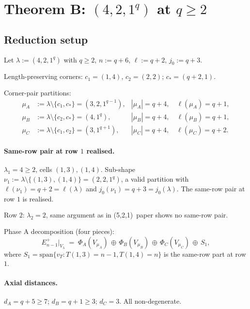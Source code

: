 \documentclass[11pt]{article}
\theoremstyle{definition}
\begin{document}
\section{Theorem B: $(4, 2, 1^q)$ at $q \ge 2$}\label{sec:421}

\subsection{Reduction setup}

Let $\lambda := (4, 2, 1^q)$ with $q \ge 2$, $n := q + 6$,
$\ell := q + 2$, $j_0 := q + 3$.

Length-preserving corners: $c_1 = (1, 4)$, $c_2 = (2, 2)$;
$c_* = (q + 2, 1)$.

Corner-pair partitions:
\begin{align*}
   \mu_A &:= \lambda \setminus \{c_1, c_*\} = (3, 2, 1^{q-1}),
      & |\mu_A| = q + 4, \quad \ell(\mu_A) = q + 1,\\
   \mu_B &:= \lambda \setminus \{c_2, c_*\} = (4, 1^q),
      & |\mu_B| = q + 4, \quad \ell(\mu_B) = q + 1,\\
   \mu_C &:= \lambda \setminus \{c_1, c_2\} = (3, 1^{q+1}),
      & |\mu_C| = q + 4, \quad \ell(\mu_C) = q + 2.
\end{align*}

\paragraph{Same-row pair at row $1$ realised.}
$\lambda_1 = 4 \ge 2$, cells $(1, 3), (1, 4)$. Sub-shape
$\nu_1 := \lambda \setminus \{(1, 3), (1, 4)\} = (2, 2, 1^q)$, a valid
partition with $\ell(\nu_1) = q + 2 = \ell(\lambda)$ and
$j_0(\nu_1) = q + 3 = j_0(\lambda)$. The same-row pair at row $1$
is realised.

Row $2$: $\lambda_2 = 2$, same argument as in (5,2,1)~paper shows no
same-row pair.

Phase A decomposition (four pieces):
\begin{equation}\label{eq:phaseA-421}
   E_{n-1}^+|_{V_\lambda}
   \;=\;
   \Phi_A(V_{\mu_A})
   \,\oplus\, \Phi_B(V_{\mu_B})
   \,\oplus\, \Phi_C(V_{\mu_C})
   \,\oplus\, S_1,
\end{equation}
where $S_1 = \mathrm{span}\{v_T : T(1, 3) = n - 1, T(1, 4) = n\}$
is the same-row part at row $1$.

\paragraph{Axial distances.}
$d_A = q + 5 \ge 7$; $d_B = q + 1 \ge 3$; $d_C = 3$. All non-degenerate.
\end{document}
